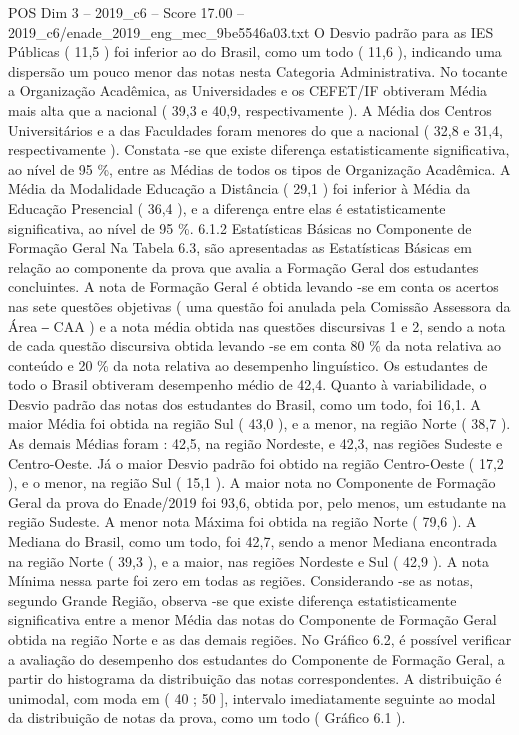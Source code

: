 \begin{textsample}{POS Dim 3 – 2019\_c6 – Score 17.00 – 2019\_c6/enade\_2019\_eng\_mec\_9be5546a03.txt}
O Desvio padrão para as IES Públicas ( 11,5 ) foi inferior ao do Brasil, como um todo ( 11,6 ), indicando uma dispersão um pouco menor das notas nesta Categoria Administrativa.
No tocante a Organização Acadêmica, as Universidades e os CEFET/IF obtiveram Média mais alta que a nacional ( 39,3 e 40,9, respectivamente ).
A Média dos Centros Universitários e a das Faculdades foram menores do que a nacional ( 32,8 e 31,4, respectivamente ).
Constata -se que existe diferença estatisticamente significativa, ao nível de 95 \%, entre as Médias de todos os tipos de Organização Acadêmica.
A Média da Modalidade Educação a Distância ( 29,1 ) foi inferior à Média da Educação Presencial ( 36,4 ), e a diferença entre elas é estatisticamente significativa, ao nível de 95 \%. 6.1.2 Estatísticas Básicas no Componente de Formação Geral Na Tabela 6.3, são apresentadas as Estatísticas Básicas em relação ao componente da prova que avalia a Formação Geral dos estudantes concluintes.
A nota de Formação Geral é obtida levando -se em conta os acertos nas sete questões objetivas ( uma questão foi anulada pela Comissão Assessora da Área ‒ CAA ) e a nota média obtida nas questões discursivas 1 e 2, sendo a nota de cada questão discursiva obtida levando -se em conta 80 \% da nota relativa ao conteúdo e 20 \% da nota relativa ao desempenho linguístico.
Os estudantes de todo o Brasil obtiveram desempenho médio de 42,4.
Quanto à variabilidade, o Desvio padrão das notas dos estudantes do Brasil, como um todo, foi 16,1.
A maior Média foi obtida na região Sul ( 43,0 ), e a menor, na região Norte ( 38,7 ).
As demais Médias foram : 42,5, na região Nordeste, e 42,3, nas regiões Sudeste e Centro-Oeste.
Já o maior Desvio padrão foi obtido na região Centro-Oeste ( 17,2 ), e o menor, na região Sul ( 15,1 ).
A maior nota no Componente de Formação Geral da prova do Enade/2019 foi 93,6, obtida por, pelo menos, um estudante na região Sudeste.
A menor nota Máxima foi obtida na região Norte ( 79,6 ).
A Mediana do Brasil, como um todo, foi 42,7, sendo a menor Mediana encontrada na região Norte ( 39,3 ), e a maior, nas regiões Nordeste e Sul ( 42,9 ).
A nota Mínima nessa parte foi zero em todas as regiões.
Considerando -se as notas, segundo Grande Região, observa -se que existe diferença estatisticamente significativa entre a menor Média das notas do Componente de Formação Geral obtida na região Norte e as das demais regiões.
No Gráfico 6.2, é possível verificar a avaliação do desempenho dos estudantes do Componente de Formação Geral, a partir do histograma da distribuição das notas correspondentes.
A distribuição é unimodal, com moda em ( 40 ; 50 ], intervalo imediatamente seguinte ao modal da distribuição de notas da prova, como um todo ( Gráfico 6.1 ).

\end{textsample}
